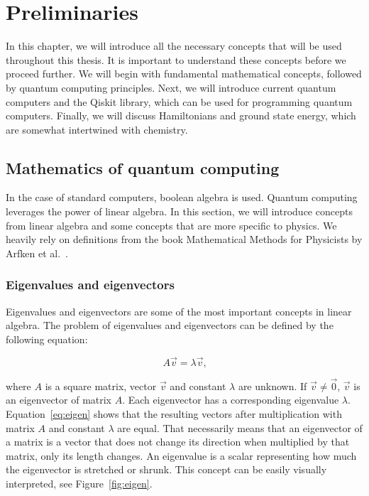 \graphicspath{ {../images/}}

\chapter{Preliminaries}\label{ch:preliminaries}
In this chapter, we will introduce all the necessary concepts that will be used throughout this thesis. It is important to understand these concepts before we proceed further. We will begin with fundamental mathematical concepts, followed by quantum computing principles. Next, we will introduce current quantum computers and the Qiskit library, which can be used for programming quantum computers. Finally, we will discuss Hamiltonians and ground state energy, which are somewhat intertwined with chemistry.

\section{Mathematics of quantum computing}
In the case of standard computers, boolean algebra is used. Quantum computing leverages the power of linear algebra. In this section, we will introduce concepts from linear algebra and some concepts that are more specific to physics. We heavily rely on definitions from the book Mathematical Methods for Physicists by Arfken et al.~\cite{mmp}.

\tocless\subsection{Eigenvalues and eigenvectors}
Eigenvalues and eigenvectors are some of the most important concepts in linear algebra. The problem of eigenvalues and eigenvectors can be defined by the following equation:

\begin{equation}
  A\vec{v} = \lambda \vec{v}\text{,}
  \label{eq:eigen}
\end{equation}

\noindent where $A$ is a square matrix, vector $\vec{v}$ and constant $\lambda$ are unknown. If $\vec{v} \neq \vec{0}$, $\vec{v}$ is an eigenvector of matrix $A$. Each eigenvector has a corresponding eigenvalue $\lambda$. Equation~\ref{eq:eigen} shows that the resulting vectors after multiplication with matrix $A$ and constant $\lambda$ are equal. That necessarily means that an eigenvector of a matrix is a vector that does not change its direction when multiplied by that matrix, only its length changes. An eigenvalue is a scalar representing how much the eigenvector is stretched or shrunk. This concept can be easily visually interpreted, see Figure~\ref{fig:eigen}.

